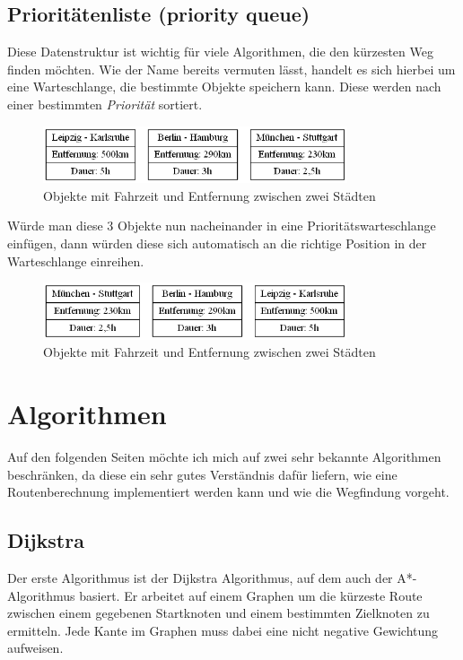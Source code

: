 \documentclass[11pt]{scrreprt}
\begin{document}
	\section{Prioritätenliste (priority queue)}
	Diese Datenstruktur ist wichtig für viele Algorithmen, die den kürzesten Weg finden möchten.
	Wie der Name bereits vermuten lässt, handelt es sich hierbei um eine Warteschlange, die bestimmte Objekte speichern kann.
	Diese werden nach einer bestimmten \textit{Priorität} sortiert.

	\begin{figure}[ht]
		\centering
		\includegraphics[width=0.8\textwidth]{Graphs/pq_objects}
		\caption{Objekte mit Fahrzeit und Entfernung zwischen zwei Städten}
	\end{figure}
	
	Würde man diese 3 Objekte nun nacheinander in eine Prioritätswarteschlange einfügen, dann würden diese sich automatisch an die richtige Position in der Warteschlange einreihen.
	
	\begin{figure}[ht]
		\centering
		\includegraphics[width=0.8\textwidth]{Graphs/pq_sorted_distance}
		\caption{Objekte mit Fahrzeit und Entfernung zwischen zwei Städten}
	\end{figure}

\chapter{Algorithmen}
Auf den folgenden Seiten möchte ich mich auf zwei sehr bekannte Algorithmen beschränken, da diese ein sehr gutes Verständnis dafür liefern, wie eine Routenberechnung implementiert werden kann und wie die Wegfindung vorgeht.

	\section{Dijkstra}
	Der erste Algorithmus ist der Dijkstra Algorithmus, auf dem auch der A*-Algorithmus basiert.
	Er arbeitet auf einem Graphen um die kürzeste Route zwischen einem gegebenen Startknoten und einem bestimmten Zielknoten zu ermitteln. Jede Kante im Graphen muss dabei eine nicht negative Gewichtung aufweisen.
	
\end{document}
